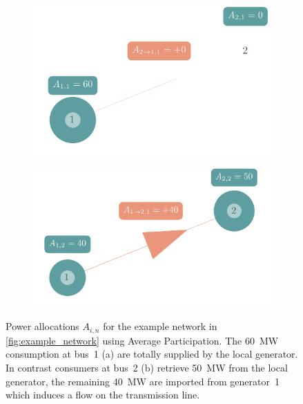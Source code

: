 \documentclass[11pt,twocolumn]{article}
\begin{document}
\begin{figure}[h!]
    \begin{subfigure}[c]{.495\linewidth}
    \includegraphics[width=\linewidth]{example_allocation_bus1_net_ptpf.png}
    \vspace{-40pt}
    \subcaption{}
    \label{fig:example_allocation_bus1}
    \end{subfigure}
    \begin{subfigure}[c]{.495\linewidth}
    \includegraphics[width=\linewidth]{example_allocation_bus2_net_ptpf.png}
    \vspace{-40pt}
    \subcaption{}
    \label{fig:example_allocation_bus2}
    \end{subfigure}
    \caption{Power allocations $A_{i,n}$ for the example network in \cref{fig:example_network} using Average Participation. The 60~MW consumption at bus~1 (a) are totally supplied by the local generator. In contrast consumers at bus~2 (b) retrieve 50~MW from the local generator, the remaining 40~MW are imported from generator~1 which induces a flow on the transmission line.}
    \label{fig:example_allocation}
\end{figure}
\end{document}
